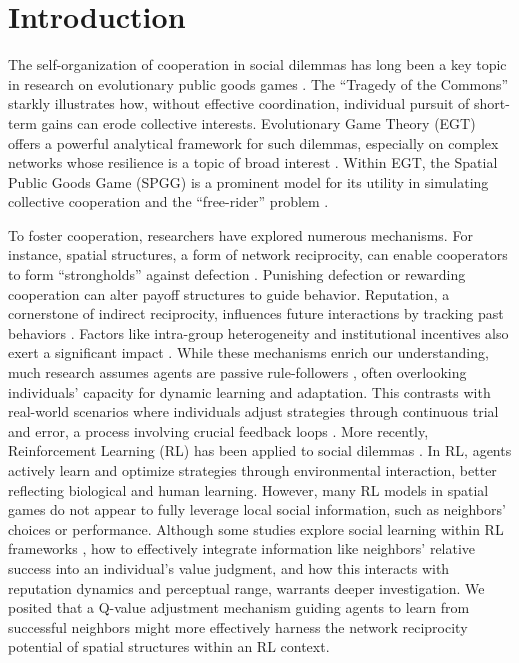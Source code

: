\documentclass[preprint,number,sort&compress,12pt]{elsarticle}
\begin{document}
\section{Introduction}
\label{sec:introduction}

The self-organization of cooperation in social dilemmas has long been a key topic in research on evolutionary public goods games \cite{1, 2, 3, 4, 5, 6, 7}. The ``Tragedy of the Commons'' \cite{8} starkly illustrates how, without effective coordination, individual pursuit of short-term gains can erode collective interests. Evolutionary Game Theory (EGT) offers a powerful analytical framework for such dilemmas, especially on complex networks whose resilience is a topic of broad interest \cite{9, 10, 11, 12, 13, 64}. Within EGT, the Spatial Public Goods Game (SPGG) is a prominent model for its utility in simulating collective cooperation and the ``free-rider'' problem \cite{14, 15, 16, 17, 18, 19}.

To foster cooperation, researchers have explored numerous mechanisms. For instance, spatial structures, a form of network reciprocity, can enable cooperators to form ``strongholds'' against defection \cite{20, 21}. Punishing defection \cite{22, 23, 24, 25, 26, 27, 28, 29} or rewarding cooperation \cite{30, 31, 32} can alter payoff structures to guide behavior. Reputation, a cornerstone of indirect reciprocity, influences future interactions by tracking past behaviors \cite{33, 34, 35, 36, 37, 38, 39, 40, 58, 62, 63}. Factors like intra-group heterogeneity and institutional incentives also exert a significant impact \cite{40, 41, 42, 61, 63}. While these mechanisms enrich our understanding, much research assumes agents are passive rule-followers \cite{43, 44}, often overlooking individuals' capacity for dynamic learning and adaptation. This contrasts with real-world scenarios where individuals adjust strategies through continuous trial and error, a process involving crucial feedback loops \cite{45, 46, 57}. More recently, Reinforcement Learning (RL) \cite{47} has been applied to social dilemmas \cite{48, 49, 50, 51, 52, 53, 54, 55, 59, 60}. In RL, agents actively learn and optimize strategies through environmental interaction, better reflecting biological and human learning. However, many RL models in spatial games do not appear to fully leverage local social information, such as neighbors' choices or performance. Although some studies explore social learning within RL frameworks \cite{55, 56, 58}, how to effectively integrate information like neighbors' relative success into an individual's value judgment, and how this interacts with reputation dynamics and perceptual range, warrants deeper investigation. We posited that a Q-value adjustment mechanism guiding agents to learn from successful neighbors might more effectively harness the network reciprocity potential of spatial structures within an RL context.
\end{document}
